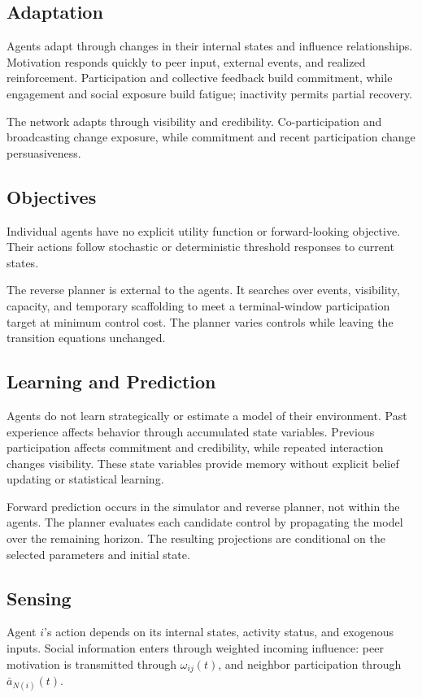 \documentclass[11pt]{article}
\begin{document}
\subsection{Adaptation}
Agents adapt through changes in their internal states and influence relationships. Motivation responds quickly to peer input, external events, and realized reinforcement. Participation and collective feedback build commitment, while engagement and social exposure build fatigue; inactivity permits partial recovery.

The network adapts through visibility and credibility. Co-participation and broadcasting change exposure, while commitment and recent participation change persuasiveness.

\subsection{Objectives}
Individual agents have no explicit utility function or forward-looking objective. Their actions follow stochastic or deterministic threshold responses to current states.

The reverse planner is external to the agents. It searches over events, visibility, capacity, and temporary scaffolding to meet a terminal-window participation target at minimum control cost. The planner varies controls while leaving the transition equations unchanged.

\subsection{Learning and Prediction}
Agents do not learn strategically or estimate a model of their environment. Past experience affects behavior through accumulated state variables. Previous participation affects commitment and credibility, while repeated interaction changes visibility. These state variables provide memory without explicit belief updating or statistical learning.

Forward prediction occurs in the simulator and reverse planner, not within the agents. The planner evaluates each candidate control by propagating the model over the remaining horizon. The resulting projections are conditional on the selected parameters and initial state.

\subsection{Sensing}
Agent $i$'s action depends on its internal states, activity status, and exogenous inputs. Social information enters through weighted incoming influence: peer motivation is transmitted through  $\omega_{ij}(t)$, and neighbor participation through $\bar{a}_{N(i)}(t)$.
\end{document}
